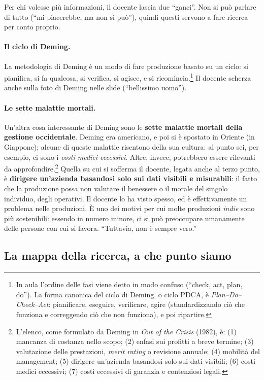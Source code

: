 Per chi volesse più informazioni, il docente lascia due ``ganci''. Non si può
parlare di tutto (``mi piacerebbe, ma non si può''), quindi questi servono a
fare ricerca per conto proprio.

\paragraph{Il ciclo di Deming.} La metodologia di Deming è un modo di fare
produzione basato su un ciclo: si pianifica, si fa qualcosa, si verifica, si
agisce, e si ricomincia.\footnote{In aula l'ordine delle fasi viene detto in
modo confuso (``check, act, plan, do''). La forma canonica del ciclo di
Deming, o ciclo PDCA, è \emph{Plan--Do--Check--Act}: pianificare, eseguire,
verificare, agire (standardizzando ciò che funziona e correggendo ciò che non
funziona), e poi ripartire.} Il docente scherza anche sulla foto di Deming
nelle slide (``bellissimo uomo'').

\paragraph{Le sette malattie mortali.} Un'altra cosa interessante di Deming
sono le \textbf{sette malattie mortali della gestione occidentale}. Deming
era americano, e poi si è spostato in Oriente (in Giappone); alcune di queste
malattie risentono della sua cultura: al punto sei, per esempio, ci sono i
\emph{costi medici eccessivi}. Altre, invece, potrebbero essere rilevanti da
approfondire.\footnote{L'elenco, come formulato da Deming in \emph{Out of the
Crisis} (1982), è: (1) mancanza di costanza nello scopo; (2) enfasi sui
profitti a breve termine; (3) valutazione delle prestazioni, \emph{merit
rating} o revisione annuale; (4) mobilità del management; (5) dirigere
un'azienda basandosi solo sui dati visibili; (6) costi medici eccessivi;
(7) costi eccessivi di garanzia e contenziosi legali.} Quella su cui si
sofferma il docente, legata anche al terzo punto, è \textbf{dirigere
un'azienda basandosi solo sui dati visibili e misurabili}: il fatto che la
produzione possa non valutare il benessere o il morale del singolo individuo,
degli operativi. Il docente lo ha visto spesso, ed è effettivamente un
problema nelle produzioni. È uno dei motivi per cui molte produzioni
\emph{indie} sono più sostenibili: essendo in numero minore, ci si può
preoccupare umanamente delle persone con cui si lavora. ``Tuttavia, non è
sempre vero.''

\subsection{La mappa della ricerca, a che punto siamo}


